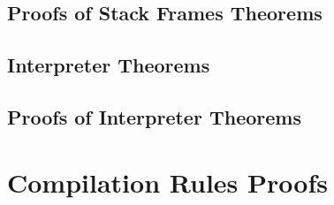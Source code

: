 \documentclass[a4paper,11pt]{report}
\begin{document}
\begin{refsection}
\section{Proofs of Stack Frames Theorems}
\label{stack-frames-proofs-appendix}



\section{Interpreter Theorems}
\label{interpreter-theorems-appendix}



\section{Proofs of Interpreter Theorems}
\label{interpreter-proofs-appendix}




\normalsize
\chapter{Compilation Rules Proofs}
\label{compilation-rules-proofs-appendix}


{\raggedright \printbibliography[resetnumbers=true]}
\end{refsection}
\end{document}
